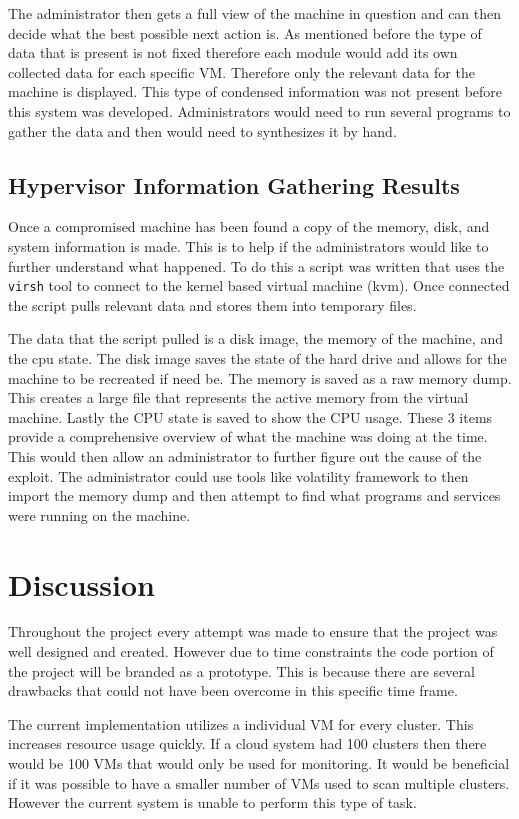 \documentclass[12pt]{article}
\begin{document}
The administrator then gets a full view of the machine in question and can then decide what the best possible next action is. As mentioned before the type of data that is present is not fixed therefore each module would add its own collected data for each specific VM. Therefore only the relevant data for the machine is displayed. This type of condensed information was not present before this system was developed. Administrators would need to run several programs to gather the data and then would need to synthesizes it by hand.

\subsection{Hypervisor Information Gathering Results}
Once a compromised machine has been found a copy of the memory, disk, and system information is made. This is to help if the administrators would like to further understand what happened. To do this a script was written that uses the \lstinline{virsh} tool to connect to the kernel based virtual machine (kvm). Once connected the script pulls relevant data and stores them into temporary files.

The data that the script pulled is a disk image, the memory of the machine, and the cpu state. The disk image saves the state of the hard drive and allows for the machine to be recreated if need be. The memory is saved as a raw memory dump. This creates a large file that represents the active memory from the virtual machine. Lastly the CPU state is saved to show the CPU usage. These 3 items provide a comprehensive overview of what the machine was doing at the time. This would then allow an administrator to further figure out the cause of the exploit. The administrator could use tools like volatility framework \cite{volitilityFram} to then import the memory dump and then attempt to find what programs and services were running on the machine.

\section{Discussion}
Throughout the project every attempt was made to ensure that the project was well designed and created. However due to time constraints the code portion of the project will be branded as a prototype. This is because there are several drawbacks that could not have been overcome in this specific time frame.

The current implementation utilizes a individual VM for every cluster. This increases resource usage quickly. If a cloud system had 100 clusters then there would be 100 VMs that would only be used for monitoring. It would be beneficial if it was possible to have a smaller number of VMs used to scan multiple clusters. However the current system is unable to perform this type of task.
\end{document}
